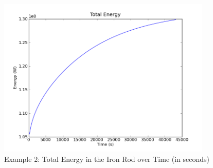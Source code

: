 \begin{figure}[ht]
\begin{center}
\includegraphics[width=4in]{figures/ttrodpyplot150}
\caption{Example 2: Total Energy in the Iron Rod over Time (in seconds)}
\label{fig:onedheatout1 002} 
\end{center}
\end{figure}

